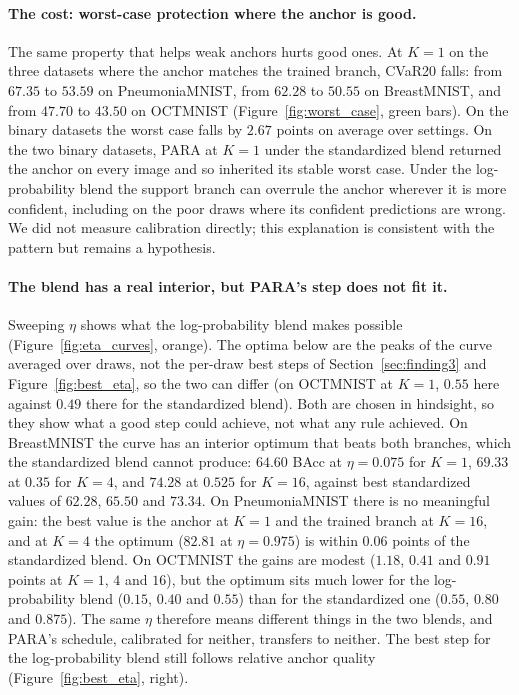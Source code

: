 

\paragraph{The cost: worst-case protection where the anchor is good.}
The same property that helps weak anchors hurts good ones.
At $K = 1$ on the three datasets where the anchor matches the trained branch, CVaR20 falls:
from $67.35$ to $53.59$ on PneumoniaMNIST, from $62.28$ to $50.55$ on BreastMNIST, and from $47.70$ to $43.50$ on OCTMNIST
(Figure~\ref{fig:worst_case}, green bars).
On the binary datasets the worst case falls by $2.67$ points on average over settings.
On the two binary datasets, PARA at $K = 1$ under the standardized blend returned the anchor on every image and so inherited its stable worst case.
Under the log-probability blend the support branch can overrule the anchor wherever it is more confident,
including on the poor draws where its confident predictions are wrong.
We did not measure calibration directly; this explanation is consistent with the pattern but remains a hypothesis.



\paragraph{The blend has a real interior, but PARA's step does not fit it.}
Sweeping $\eta$ shows what the log-probability blend makes possible (Figure~\ref{fig:eta_curves}, orange).
The optima below are the peaks of the curve averaged over draws, not the per-draw best steps of Section~\ref{sec:finding3} and Figure~\ref{fig:best_eta},
so the two can differ (on OCTMNIST at $K = 1$, $0.55$ here against $0.49$ there for the standardized blend).
Both are chosen in hindsight, so they show what a good step could achieve, not what any rule achieved.
On BreastMNIST the curve has an interior optimum that beats both branches, which the standardized blend cannot produce:
$64.60$ BAcc at $\eta = 0.075$ for $K = 1$, $69.33$ at $0.35$ for $K = 4$, and $74.28$ at $0.525$ for $K = 16$,
against best standardized values of $62.28$, $65.50$ and $73.34$.
On PneumoniaMNIST there is no meaningful gain: the best value is the anchor at $K = 1$ and the trained branch at $K = 16$,
and at $K = 4$ the optimum ($82.81$ at $\eta = 0.975$) is within $0.06$ points of the standardized blend.
On OCTMNIST the gains are modest ($1.18$, $0.41$ and $0.91$ points at $K = 1$, $4$ and $16$),
but the optimum sits much lower for the log-probability blend ($0.15$, $0.40$ and $0.55$) than for the standardized one ($0.55$, $0.80$ and $0.875$).
The same $\eta$ therefore means different things in the two blends, and PARA's schedule, calibrated for neither, transfers to neither.
The best step for the log-probability blend still follows relative anchor quality (Figure~\ref{fig:best_eta}, right).


